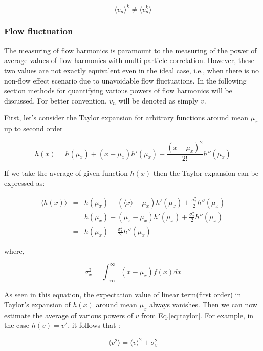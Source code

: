 \begin{equation}
	\langle v_n \rangle^k \neq \langle v_n^k \rangle
\end{equation}
\smallskip

\subsubsection{Flow fluctuation}	

The measuring of flow harmonics is paramount to the measuring of the power of average values of flow harmonics with multi-particle correlation. However, these two values are not exactly equivalent even in the ideal case, i.e., when there is no non-flow effect scenario due to unavoidable flow fluctuations. In the following section methods for quantifying various powers of flow harmonics will be discussed. For better convention, $v_n$ will be denoted as simply $v$.

First, let's consider the Taylor expansion for arbitrary functions around mean $\mu_x $ up to second order

\begin{equation}
	h(x) = h(\mu_x) + (x-\mu_x)h'(\mu_x)+\frac{(x-\mu_x)^2}{2!}h''(\mu_x)
\end{equation}
\smallskip

If we take the average of given function $h(x)$ then the Taylor expansion can be expressed as:

\begin{eqnarray}
	\langle h(x) \rangle &=& h(\mu_x) + ( \langle x \rangle - \mu_x )h'(\mu_x) + \frac{\sigma_x^2}{2}h''(\mu_x)  \\
	&=&  h(\mu_x) + ( \mu_x- \mu_x) h'(\mu_x) + \frac{\sigma_x^2}{2}h''(\mu_x) \\ 
	&=& h(\mu_x) +\frac{\sigma_x^2}{2}h''(\mu_x) 	\label{eqn:taylor}
\end{eqnarray} 
	
	where,
	
	$$ \sigma_x^2 = \int_{-\infty}^{\infty} (x-\mu_x)f(x)dx $$
	\smallskip
	
As seen in this equation, the expectation value of linear term(first order) in Taylor's expansion of $h(x)$ around mean $\mu_x$ always vanishes. Then we can now estimate the average of various powers of $v$ from Eq.\ref{eq:taylor}. For example, in the case $h(v)=v^2$, it follows that :

\begin{equation}
	\langle v^2 \rangle = \langle v \rangle^2 + \sigma_v^2 
\end{equation}

